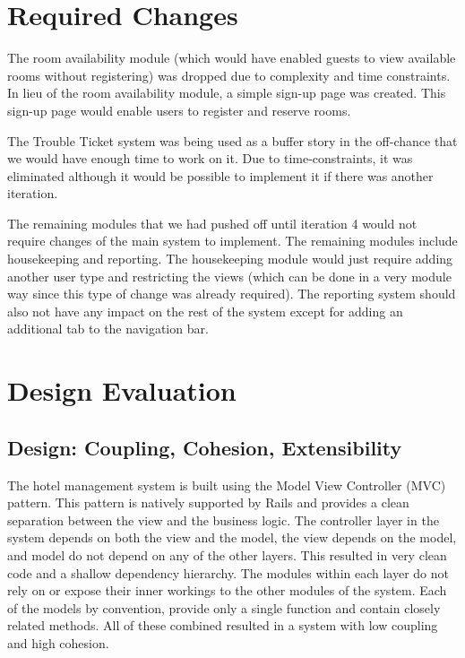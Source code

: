 \documentclass[12pt]{elsarticle}
\begin{document}
\section{Required Changes}

The room availability module (which would have enabled guests to view available rooms without registering) was dropped due to complexity and time constraints. In lieu of the room availability module, a simple sign-up page was created. This sign-up page would enable users to register and reserve rooms. 

The Trouble Ticket system was being used as a buffer story in the off-chance that we would have enough time to work on it. Due to time-constraints, it was eliminated although it would be possible to implement it if there was another iteration.

The remaining modules that we had pushed off until iteration 4 would not require changes of the main system to implement. The remaining modules include housekeeping and reporting. The housekeeping module would just require adding another user type and restricting the views (which can be done in a very module way since this type of change was already required). The reporting system should also not have any impact on the rest of the system except for adding an additional tab to the navigation bar.

\section{Design Evaluation}

\subsection{Design: Coupling, Cohesion, Extensibility}

The hotel management system is built using the Model View Controller (MVC) pattern. This pattern is natively supported by Rails and provides a clean separation between the view and the business logic. The controller layer in the system depends on both the view and the model, the view depends on the model, and model do not depend on any of the other layers. This resulted in very clean code and a shallow dependency hierarchy. The modules within each layer do not rely on or expose their inner workings to the other modules of the system. Each of the models by convention, provide only a single function and contain closely related methods. All of these combined resulted in a system with low coupling and high cohesion.
\end{document}
